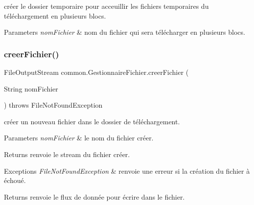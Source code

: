 créer le dossier temporaire pour acceuillir les fichiers temporaires du téléchargement en plusieurs blocs. 


\begin{DoxyParams}{Parameters}
{\em nom\+Fichier} & nom du fichier qui sera télécharger en plusieurs blocs. \\
\hline
\end{DoxyParams}
\mbox{\label{classcommon_1_1GestionnaireFichier_a7aa94ceed1766208e16cd4d3ce8465b7}} 
\subsubsection{\texorpdfstring{creer\+Fichier()}{creerFichier()}}
{\footnotesize\ttfamily File\+Output\+Stream common.\+Gestionnaire\+Fichier.\+creer\+Fichier (\begin{DoxyParamCaption}\item[{String}]{nom\+Fichier }\end{DoxyParamCaption}) throws File\+Not\+Found\+Exception\hspace{0.3cm}{\ttfamily [inline]}}



créer un nouveau fichier dans le dossier de téléchargement. 


\begin{DoxyParams}{Parameters}
{\em nom\+Fichier} & le nom du fichier créer. \\
\hline
\end{DoxyParams}
\begin{DoxyReturn}{Returns}
renvoie le stream du fichier créer. 
\end{DoxyReturn}

\begin{DoxyExceptions}{Exceptions}
{\em File\+Not\+Found\+Exception} & renvoie une erreur si la création du fichier à échoué. \\
\hline
\end{DoxyExceptions}
\begin{DoxyReturn}{Returns}
renvoie le flux de donnée pour écrire dans le fichier. 
\end{DoxyReturn}
\mbox{\label{classcommon_1_1GestionnaireFichier_a3bdc681e581824bba5c4463c680e4d29}} 
